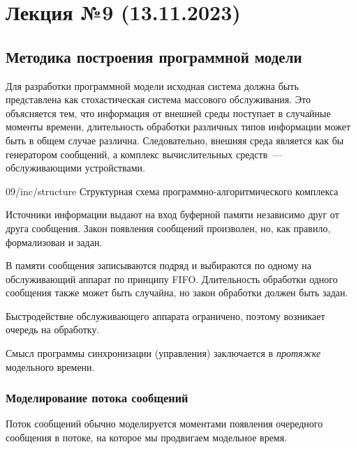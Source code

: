 \section{Лекция №9 (13.11.2023)}

\subsection{Методика построения программной модели}

Для разработки программной модели исходная система должна быть представлена как стохастическая система массового обслуживания. Это объясняется тем, что информация от внешней среды поступает в случайные моменты времени, длительность обработки различных типов информации может быть в общем случае различна. Следовательно, внешняя среда является как бы генератором сообщений, а комплекс вычислительных средств~--- обслуживающими устройствами.

\image
{\textwidth}
{09/inc/structure}
{Структурная схема программно-алгоритмического комплекса}

Источники информации выдают на вход буферной памяти независимо друг от друга сообщения. Закон появления сообщений произволен, но, как правило, формализован и задан.

В памяти сообщения записываются подряд и выбираются по одному на обслуживающий аппарат по принципу FIFO. Длительность обработки одного сообщения также может быть случайна, но закон обработки должен быть задан.

Быстродействие обслуживающего аппарата ограничено, поэтому возникает очередь на обработку.

Смысл программы синхронизации (управления) заключается в \textit{протяжке} модельного времени.

\subsubsection{Моделирование потока сообщений}

Поток сообщений обычно моделируется моментами появления очередного сообщения в потоке, на которое мы продвигаем модельное время.

